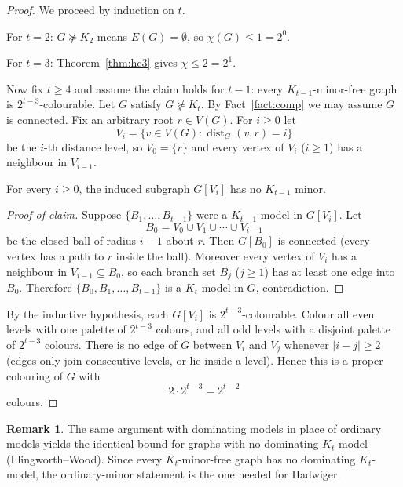 \documentclass[11pt]{article}
\theoremstyle{definition}
\newtheorem{remark}[theorem]{Remark}
\begin{document}
\begin{proof}
We proceed by induction on \(t\).

For \(t=2\): \(G\not\succcurlyeq K_2\) means \(E(G)=\emptyset\), so \(\chi(G)\le 1=2^{0}\).

For \(t=3\): Theorem~\ref{thm:hc3} gives \(\chi\le 2=2^{1}\).

Now fix \(t\ge 4\) and assume the claim holds for \(t-1\): every
\(K_{t-1}\)-minor-free graph is \(2^{t-3}\)-colourable. Let \(G\) satisfy
\(G\not\succcurlyeq K_t\). By Fact~\ref{fact:comp} we may assume \(G\) is
connected. Fix an arbitrary root \(r\in V(G)\). For \(i\ge 0\) let
\[
V_i=\bigl\{v\in V(G):\operatorname{dist}_G(v,r)=i\bigr\}
\]
be the \(i\)-th distance level, so \(V_0=\{r\}\) and every vertex of \(V_i\)
(\(i\ge 1\)) has a neighbour in \(V_{i-1}\).

\begin{claim}
For every \(i\ge 0\), the induced subgraph \(G[V_i]\) has no \(K_{t-1}\) minor.
\end{claim}

\begin{proof}[Proof of claim]
Suppose \(\{B_1,\dots,B_{t-1}\}\) were a \(K_{t-1}\)-model in \(G[V_i]\). Let
\[
B_0=V_0\cup V_1\cup\cdots\cup V_{i-1}
\]
be the closed ball of radius \(i-1\) about \(r\). Then \(G[B_0]\) is connected
(every vertex has a path to \(r\) inside the ball). Moreover every vertex of
\(V_i\) has a neighbour in \(V_{i-1}\subseteq B_0\), so each branch set \(B_j\)
(\(j\ge 1\)) has at least one edge into \(B_0\). Therefore
\(\{B_0,B_1,\dots,B_{t-1}\}\) is a \(K_t\)-model in \(G\), contradiction.
\end{proof}

By the inductive hypothesis, each \(G[V_i]\) is \(2^{t-3}\)-colourable. Colour
all even levels with one palette of \(2^{t-3}\) colours, and all odd levels with
a disjoint palette of \(2^{t-3}\) colours. There is no edge of \(G\) between
\(V_i\) and \(V_j\) whenever \(|i-j|\ge 2\) (edges only join consecutive levels,
or lie inside a level). Hence this is a proper colouring of \(G\) with
\[
2\cdot 2^{t-3}=2^{t-2}
\]
colours.
\end{proof}

\begin{remark}
The same argument with dominating models in place of ordinary models yields
the identical bound for graphs with no dominating \(K_t\)-model
(Illingworth--Wood). Since every \(K_t\)-minor-free graph has no dominating
\(K_t\)-model, the ordinary-minor statement is the one needed for Hadwiger.
\end{remark}
\end{document}
